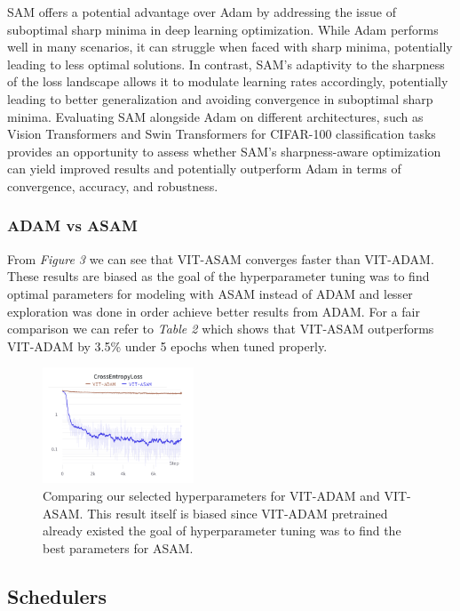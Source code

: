 \documentclass{article}
\begin{document}
SAM offers a potential advantage over Adam by addressing the issue of suboptimal sharp minima in deep learning optimization.
While Adam performs well in many scenarios, it can struggle when faced with sharp minima, potentially leading to less optimal solutions.
In contrast, SAM's adaptivity to the sharpness of the loss landscape allows it to modulate learning rates accordingly, potentially leading to better generalization and avoiding convergence in suboptimal sharp minima.
Evaluating SAM alongside Adam on different architectures, such as Vision Transformers and Swin Transformers for CIFAR-100 classification tasks provides an opportunity to assess whether SAM's sharpness-aware optimization can yield improved results and potentially outperform Adam in terms of convergence, accuracy, and robustness.

\subsubsection{ADAM vs ASAM}
From \textit{Figure 3} we can see that VIT-ASAM converges faster than VIT-ADAM.
These results are biased as the goal of the hyperparameter tuning was to find optimal parameters for modeling with ASAM instead of ADAM and lesser exploration was done in order achieve better results from ADAM.
For a fair comparison we can refer to \textit{Table 2} which shows that VIT-ASAM outperforms VIT-ADAM by 3.5\% under 5 epochs when tuned properly.

\begin{figure}[ht]
    \vskip 0.2in
    \centering
    \includegraphics[width=0.4\textwidth]{optimizers.png}
    \caption{Comparing our selected hyperparameters for VIT-ADAM and VIT-ASAM. This result itself is biased since VIT-ADAM pretrained already existed the goal of hyperparameter tuning was to find the best parameters for ASAM.}

    \vskip -0.2in
\end{figure}

\subsection{Schedulers}
\end{document}
